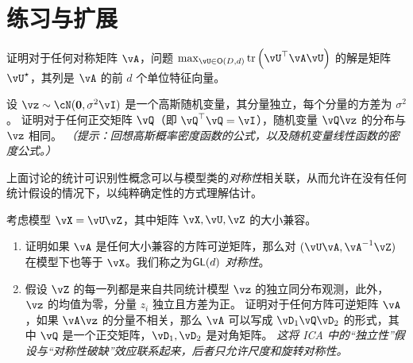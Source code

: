 \documentclass[../../book-main.tex]{subfiles}
\begin{document}
\section{练习与扩展}


\begin{exercise}\label{exercise:principal-components-derivation}
    证明对于任何对称矩阵 \(\vA\)，问题 \(\max_{\vU \in \O(D, d)}\tr\left(\vU^{\top}\vA\vU\right)\) 的解是矩阵 \(\vU^{\star}\)，其列是 \(\vA\) 的前 \(d\) 个单位特征向量。
\end{exercise}

\begin{exercise}\label{exercise:gaussian-rot-invar}
    设 $\vz \sim \cN(\Zero, \sigma^2 \vI)$ 是一个高斯随机变量，其分量独立，每个分量的方差为 $\sigma^2$。
    证明对于任何正交矩阵 $\vQ$（即 $\vQ^\top \vQ = \vI$），随机变量 $\vQ \vz$ 的分布与 $\vz$ 相同。
    \textit{（提示：回想高斯概率密度函数的公式，以及随机变量线性函数的密度公式。）}
\end{exercise}

\begin{exercise}\label{exercise:symmetry-identifiability}
    上面讨论的统计可识别性概念可以与模型类的\textit{对称性}相关联，从而允许在没有任何统计假设的情况下，以纯粹确定性的方式理解估计。

    考虑模型 $\vX = \vU \vZ$，其中矩阵 $\vX, \vU, \vZ$ 的大小兼容。
    \begin{enumerate}
        \item 证明如果 $\vA$ 是任何大小兼容的方阵可逆矩阵，那么对 $(\vU \vA, \vA^{-1} \vZ)$ 在模型下也等于 $\vX$。我们称之为\textit{$\mathsf{GL}(d)$ 对称性}。
        \item 假设 $\vZ$ 的每一列都是来自共同统计模型 $\vz$ 的独立同分布观测，此外，$\vz$ 的均值为零，分量 $z_i$ 独立且方差为正。
        证明对于任何方阵可逆矩阵 $\vA$，如果 $\vA \vz$ 的分量不相关，那么 $\vA$ 可以写成 $\vD_1 \vQ \vD_2$ 的形式，其中 $\vQ$ 是一个正交矩阵，$\vD_1, \vD_2$ 是对角矩阵。
        \textit{这将 ICA 中的“独立性”假设与“对称性破缺”效应联系起来，后者只允许尺度和旋转对称性。}
    \end{enumerate}

\end{exercise}
\end{document}
